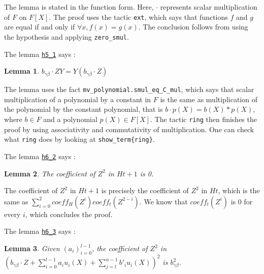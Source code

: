 \documentclass{article}
\newtheorem{lemma}{Lemma}
\theoremstyle{definition}
\theoremstyle{remark}
\begin{document}
The lemma is stated in the function form. Here, $\cdot$ represents scalar multiplication of $F$ on $F[X]$.
The proof uses the tactic \texttt{ext}, which says that functions $f$ and $g$ are equal if and only if $\forall x, f(x) = g(x)$. The conclusion follows from 
using the hypothesis and applying \texttt{zero\_smul}.

The lemma \href{https://github.com/BoltonBailey/formal-snarks-project/blob/7fd9cd122f5887f88f6a706b4f2a68a7153c7381/src/snarks/babysnark/knowledge_soundness.lean#L272}{\texttt{h5\_1}} says :
\theoremstyle{lemma} \label{h5_1}
\begin{lemma}
    $b_{\gamma \beta} \cdot ZY = Y (b_{\gamma \beta} \cdot Z)$
\end{lemma}

The lemma uses the fact \texttt{mv\_polynomial.smul\_eq\_C\_mul}, which says that scalar multiplication of a polynomial by a constant in $F$ is the same as multiplication of 
the polynomial by the constant polynomial, that is $b \cdot p(X) = b(X) * p(X)$, where $b \in F$ and a polynomial $p(X) \in F[X]$. The tactic \texttt{ring} then finishes the proof 
by using associativity and commutativity of multiplication. One can check what \texttt{ring} does by looking at \texttt{show\_term\{ring\}}.

The lemma \href{https://github.com/BoltonBailey/formal-snarks-project/blob/7fd9cd122f5887f88f6a706b4f2a68a7153c7381/src/snarks/babysnark/knowledge_soundness.lean#L279}{\texttt{h6\_2}} says : 
\theoremstyle{lemma}
\begin{lemma} \label{h6_2}
  The coefficient of $Z^2$ in $H t + 1$ is 0.
\end{lemma}

The coefficient of $Z^2$ in $H t + 1$ is precisely the coefficient of $Z^2$ in $H t$, which is the same as $\sum_{i= 0}^2 coeff_{H}(Z^i) coeff_{t}(Z^{2 - i})$.
We know that $coeff_{t}(Z^i)$ is 0 for every $i$, which concludes the proof.

The lemma \href{https://github.com/BoltonBailey/formal-snarks-project/blob/7fd9cd122f5887f88f6a706b4f2a68a7153c7381/src/snarks/babysnark/knowledge_soundness.lean#L311}{\texttt{h6\_3}} says : 
\theoremstyle{lemma}
\begin{lemma} \label{h6_3}
  Given $(a_i)_{i = 0}^{l - 1}$, the coefficient of $Z^2$ in $(b_{\gamma \beta} \cdot Z + \sum_{i = 0}^{l - 1} a_i u_i (X) + \sum_{j = l}^{n - 1} b'_i u_i (X))^2$ is $b_{\gamma \beta}^2$.
\end{lemma}
\end{document}
